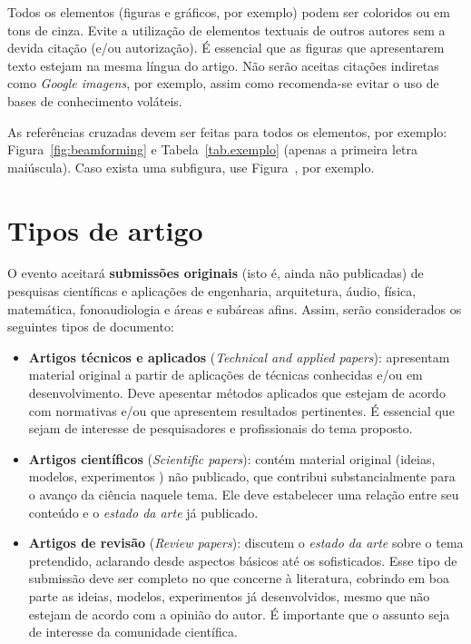\documentclass[12pt, a4paper, twoside, twocolumn]{article}
\begin{document}
Todos os elementos (figuras e gráficos, por exemplo) podem ser coloridos ou em tons de cinza. Evite a utilização de elementos textuais de outros autores sem a devida citação (e/ou autorização). É essencial que as figuras que apresentarem texto estejam na mesma língua do artigo. Não serão aceitas citações indiretas como \textit{Google imagens}, por exemplo, assim como recomenda-se evitar o uso de bases de conhecimento voláteis.

As referências cruzadas devem ser feitas para todos os elementos, por exemplo: Figura~\ref{fig:beamforming} e Tabela~\ref{tab.exemplo} (apenas a primeira letra maiúscula). Caso exista uma subfigura, use Figura~, por exemplo.


\section{Tipos de artigo}

O evento aceitará \textbf{submissões originais} (isto é, ainda não publicadas) de pesquisas científicas e aplicações de engenharia, arquitetura, áudio, física, matemática, fonoaudiologia e áreas e subáreas afins. Assim, serão considerados os seguintes tipos de documento:
%
\begin{itemize}[noitemsep,topsep=-1ex] \itemsep=7pt
	\item \textbf{Artigos técnicos e aplicados} (\textit{Technical and applied papers}):
	apresentam material original a partir de aplicações de técnicas conhecidas e/ou em desenvolvimento. Deve apesentar métodos aplicados que estejam de acordo com normativas e/ou que apresentem resultados pertinentes. É essencial que sejam de interesse de pesquisadores e profissionais do tema proposto.
	
	\item \textbf{Artigos científicos} (\textit{Scientific papers}): 
	contém material original (ideias, modelos, experimentos \etc) não publicado, que contribui substancialmente para o avanço da ciência naquele tema. Ele deve estabelecer uma relação entre seu conteúdo e o \textit{estado da arte} já publicado. 
	

	\item \textbf{Artigos de revisão} (\textit{Review papers}):
	discutem o \textit{estado da arte} sobre o tema pretendido, aclarando desde aspectos básicos até os sofisticados. Esse tipo de submissão deve ser completo no que concerne à literatura, cobrindo em boa parte as ideias, modelos, experimentos \etc já desenvolvidos, mesmo que não estejam de acordo com a opinião do autor. É importante que o assunto seja de interesse da comunidade científica.	
\end{itemize}
\end{document}
